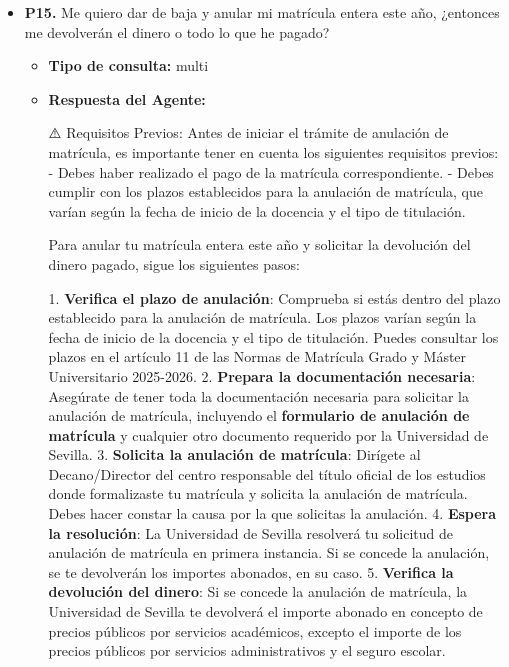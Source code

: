\documentclass{article}
\begin{document}
\begin{itemize}
  \item \textbf{P15.} Me quiero dar de baja y anular mi matrícula entera este año, ¿entonces me devolverán el dinero o todo lo que he pagado? \\
        \begin{itemize}
          \item \textbf{Tipo de consulta:} multi
          \item \textbf{Respuesta del Agente:}

                ⚠️ Requisitos Previos:
                Antes de iniciar el trámite de anulación de matrícula, es importante tener en cuenta los siguientes requisitos previos:
                - Debes haber realizado el pago de la matrícula correspondiente.
                - Debes cumplir con los plazos establecidos para la anulación de matrícula, que varían según la fecha de inicio de la docencia y el tipo de titulación.

                Para anular tu matrícula entera este año y solicitar la devolución del dinero pagado, sigue los siguientes pasos:

                1. \textbf{Verifica el plazo de anulación}: Comprueba si estás dentro del plazo establecido para la anulación de matrícula. Los plazos varían según la fecha de inicio de la docencia y el tipo de titulación. Puedes consultar los plazos en el artículo 11 de las Normas de Matrícula Grado y Máster Universitario 2025-2026.
                2. \textbf{Prepara la documentación necesaria}: Asegúrate de tener toda la documentación necesaria para solicitar la anulación de matrícula, incluyendo el \textbf{formulario de anulación de matrícula} y cualquier otro documento requerido por la Universidad de Sevilla.
                3. \textbf{Solicita la anulación de matrícula}: Dirígete al Decano/Director del centro responsable del título oficial de los estudios donde formalizaste tu matrícula y solicita la anulación de matrícula. Debes hacer constar la causa por la que solicitas la anulación.
                4. \textbf{Espera la resolución}: La Universidad de Sevilla resolverá tu solicitud de anulación de matrícula en primera instancia. Si se concede la anulación, se te devolverán los importes abonados, en su caso.
                5. \textbf{Verifica la devolución del dinero}: Si se concede la anulación de matrícula, la Universidad de Sevilla te devolverá el importe abonado en concepto de precios públicos por servicios académicos, excepto el importe de los precios públicos por servicios administrativos y el seguro escolar.


\end{itemize}
\end{itemize}
\end{document}
